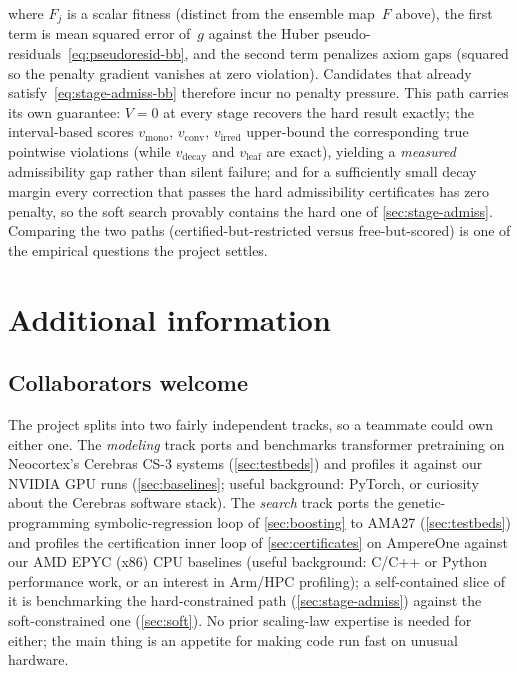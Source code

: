 \documentclass[11pt]{article}
\begin{document}
where $F_j$ is a scalar fitness (distinct from the ensemble map~$F$ above), the first term is mean squared error of~$g$ against the Huber pseudo-residuals~\eqref{eq:pseudoresid-bb}, and the second term penalizes axiom gaps (squared so the penalty gradient vanishes at zero violation).
Candidates that already satisfy~\eqref{eq:stage-admiss-bb} therefore incur no penalty pressure.
This path carries its own guarantee: $V = 0$ at every stage recovers the hard result exactly; the interval-based scores $v_{\mathrm{mono}}$, $v_{\mathrm{conv}}$, $v_{\mathrm{irred}}$ upper-bound the corresponding true pointwise violations (while $v_{\mathrm{decay}}$ and $v_{\mathrm{leaf}}$ are exact), yielding a \emph{measured} admissibility gap rather than silent failure; and for a sufficiently small decay margin every correction that passes the hard admissibility certificates has zero penalty, so the soft search provably contains the hard one of \cref{sec:stage-admiss}.
Comparing the two paths (certified-but-restricted versus free-but-scored) is one of the empirical questions the project settles.

\section{Additional information}\label{sec:additional}

\subsection{Collaborators welcome}\label{sec:collaborators}
The project splits into two fairly independent tracks, so a teammate could own either one.
The \emph{modeling} track ports and benchmarks transformer pretraining on Neocortex's Cerebras CS-3 systems (\cref{sec:testbeds}) and profiles it against our NVIDIA GPU runs (\cref{sec:baselines}; useful background: PyTorch, or curiosity about the Cerebras software stack).
The \emph{search} track ports the genetic-programming symbolic-regression loop of \cref{sec:boosting} to AMA27 (\cref{sec:testbeds}) and profiles the certification inner loop of \cref{sec:certificates} on AmpereOne against our AMD EPYC (x86) CPU baselines (useful background: C/C++ or Python performance work, or an interest in Arm/HPC profiling); a self-contained slice of it is benchmarking the hard-constrained path (\cref{sec:stage-admiss}) against the soft-constrained one (\cref{sec:soft}).
No prior scaling-law expertise is needed for either; the main thing is an appetite for making code run fast on unusual hardware.
\end{document}
